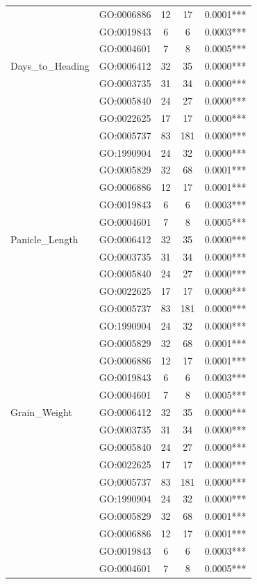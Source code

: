 \begin{table}[htbp]
\begin{tabular}{llccc}
 & GO:0006886 & 12 & 17 & 0.0001*** \\
 & GO:0019843 & 6 & 6 & 0.0003*** \\
 & GO:0004601 & 7 & 8 & 0.0005*** \\
Days_to_Heading & GO:0006412 & 32 & 35 & 0.0000*** \\
 & GO:0003735 & 31 & 34 & 0.0000*** \\
 & GO:0005840 & 24 & 27 & 0.0000*** \\
 & GO:0022625 & 17 & 17 & 0.0000*** \\
 & GO:0005737 & 83 & 181 & 0.0000*** \\
 & GO:1990904 & 24 & 32 & 0.0000*** \\
 & GO:0005829 & 32 & 68 & 0.0001*** \\
 & GO:0006886 & 12 & 17 & 0.0001*** \\
 & GO:0019843 & 6 & 6 & 0.0003*** \\
 & GO:0004601 & 7 & 8 & 0.0005*** \\
Panicle_Length & GO:0006412 & 32 & 35 & 0.0000*** \\
 & GO:0003735 & 31 & 34 & 0.0000*** \\
 & GO:0005840 & 24 & 27 & 0.0000*** \\
 & GO:0022625 & 17 & 17 & 0.0000*** \\
 & GO:0005737 & 83 & 181 & 0.0000*** \\
 & GO:1990904 & 24 & 32 & 0.0000*** \\
 & GO:0005829 & 32 & 68 & 0.0001*** \\
 & GO:0006886 & 12 & 17 & 0.0001*** \\
 & GO:0019843 & 6 & 6 & 0.0003*** \\
 & GO:0004601 & 7 & 8 & 0.0005*** \\
Grain_Weight & GO:0006412 & 32 & 35 & 0.0000*** \\
 & GO:0003735 & 31 & 34 & 0.0000*** \\
 & GO:0005840 & 24 & 27 & 0.0000*** \\
 & GO:0022625 & 17 & 17 & 0.0000*** \\
 & GO:0005737 & 83 & 181 & 0.0000*** \\
 & GO:1990904 & 24 & 32 & 0.0000*** \\
 & GO:0005829 & 32 & 68 & 0.0001*** \\
 & GO:0006886 & 12 & 17 & 0.0001*** \\
 & GO:0019843 & 6 & 6 & 0.0003*** \\
 & GO:0004601 & 7 & 8 & 0.0005*** \\

\end{tabular}
\end{table}
